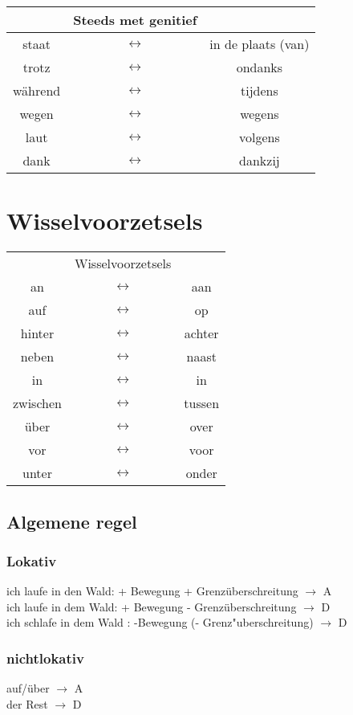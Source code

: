 \documentclass[main.tex]{subfiles}
\begin{document}
\begin{tabular}{ccc}
 & Steeds met genitief &  \\ 
 \hline
staat & $\leftrightarrow$ & in de plaats (van) \\ 
trotz & $\leftrightarrow$ & ondanks \\ 
während & $\leftrightarrow$ & tijdens \\ 
wegen & $\leftrightarrow$ & wegens \\ 
laut & $\leftrightarrow$ & volgens \\ 
dank & $\leftrightarrow$ & dankzij \\ 
\end{tabular} 

\section{Wisselvoorzetsels}

\begin{tabular}{ccc}
 & Wisselvoorzetsels &  \\ 
an & $\leftrightarrow$ & aan \\ 
auf & $\leftrightarrow$ & op \\ 
hinter & $\leftrightarrow$ & achter \\ 
neben & $\leftrightarrow$ & naast \\ 
in & $\leftrightarrow$ & in \\ 
zwischen & $\leftrightarrow$ & tussen \\ 
über & $\leftrightarrow$ & over \\ 
vor & $\leftrightarrow$ & voor \\ 
unter & $\leftrightarrow$ & onder \\ 
\end{tabular} 

\subsection{Algemene regel}
\subsubsection{Lokativ}
ich laufe in den Wald: + Bewegung + Grenzüberschreitung $\rightarrow$ A\\
ich laufe in dem Wald: + Bewegung - Grenzüberschreitung $\rightarrow$ D\\
ich schlafe in dem Wald : -Bewegung (- Grenz"uberschreitung) $\rightarrow$ D
\subsubsection{nichtlokativ}
auf/über $\rightarrow$ A\\
der Rest $\rightarrow$ D
\end{document}
